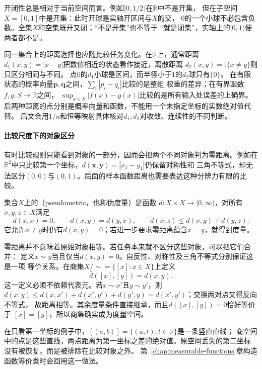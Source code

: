 开闭性总是相对于当前空间而言。例如$[0,1/2)$在$\mathbb R$中不是开集，
但在子空间$X=[0,1]$中是开集：此时开球是实轴开区间与$X$的交，
$0$的一个小球不必包含负数。全集$X$和空集既开又闭；“不是开集”也不等于
“就是闭集”，实轴上的$[0,1)$便两者都不是。

同一集合上的距离选择也应随比较任务变化。在$\mathbb R$上，通常距离
$d_1(x,y)=|x-y|$把数值相近的状态看作接近，离散距离
$d_2(x,y)=\mathbb I\{x\neq y\}$则只区分相同与不同。
点$0$的$d_1$小球是区间，而半径小于$1$的$d_2$球只有$\{0\}$。
在有限状态的概率向量$\bm p,\bm q$之间，$\sum_i|p_i-q_i|$比较的是整组
权重的差异；在有界函数$f,g:S\to\mathbb R$之间，
$\sup_{x\in S}|f(x)-g(x)|$比较的是所有输入处误差的上确界。
后两种距离的点分别是概率向量和函数，不能用一个未指定坐标的实数绝对值代替。
后文会用$1/n$和恒等映射具体核对$d_1,d_2$对收敛、连续性的不同判断。

\paragraph{比较尺度下的对象区分}

有时比较规则只能看到对象的一部分，因而会把两个不同对象判为零距离。例如在
$\mathbb R^2$中只比较第一个坐标，$d(\bm x,\bm y)=|x_1-y_1|$仍保留对称性和
三角不等式，却无法区分$(0,0)$与$(0,1)$。后面的样本函数距离也需要表达这种分辨力有限的比较。
\begin{definition}[伪距离]
\label{def:analysis-pseudometric}
集合$X$上的（pseudometric，也称伪度量）是函数
$d:X\times X\to[0,\infty)$，对所有$x,y,z\in X$满足
\[
 d(x,x)=0,\qquad d(x,y)=d(y,x),\qquad d(x,z)\leq d(x,y)+d(y,z).
\]
它允许$x\neq y$时仍有$d(x,y)=0$；若进一步要求零距离蕴含$x=y$，就得到度量。
\end{definition}
零距离并不意味着原始对象相等。若任务本来就不区分这些对象，可以把它们合并：
定义$x\sim y$当且仅当$d(x,y)=0$。自反性、对称性及三角不等式分别保证这是一项
等价关系。在商集$X/{\sim}=\{[x]:x\in X\}$上定义
\begin{equation}
 \bar d([x],[y])=d(x,y).
\label{eq:analysis-quotient-metric}
\end{equation}
这一定义必须不依赖代表元。若$x\sim x'$且$y\sim y'$，则
$d(x,y)\leq d(x,x')+d(x',y')+d(y',y)=d(x',y')$；交换两对点又得反向不等式，
故距离相等。其余度量条件直接继承，而且$\bar d([x],[y])=0$恰好等价于
$[x]=[y]$，所以商集确实成为度量空间。

在只看第一坐标的例子中，$[(a,b)]=\{(a,t):t\in\mathbb R\}$是一条竖直直线；
商空间中的点是这些直线，两点距离为第一坐标之差的绝对值。原空间丢失的第二坐标
没有被恢复，而是被排除在比较对象之外。
第~\ref{chap:measurable-functions}章构造函数等价类时会回用这一做法。

